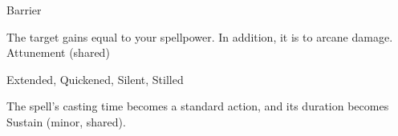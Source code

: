\begin{spellsection}{Barrier}
\begin{spellheader}
\end{spellheader}
\begin{spellcontent}
\begin{spelltargetinginfo}
\end{spelltargetinginfo}
\begin{spelleffects}
\spelleffect
The target gains  equal to your spellpower.
In addition, it is  to arcane damage.
\spelldur Attunement (shared)
\end{spelleffects}
\end{spellcontent}
\begin{spellfooter}
 Extended, Quickened, Silent, Stilled
\end{spellfooter}
\begin{spellsubcontent}
\begin{spellcantrip}
The spell's casting time becomes a standard action, and its duration becomes Sustain (minor, shared).
\end{spellcantrip}
\end{spellsubcontent}
\end{spellsection}
